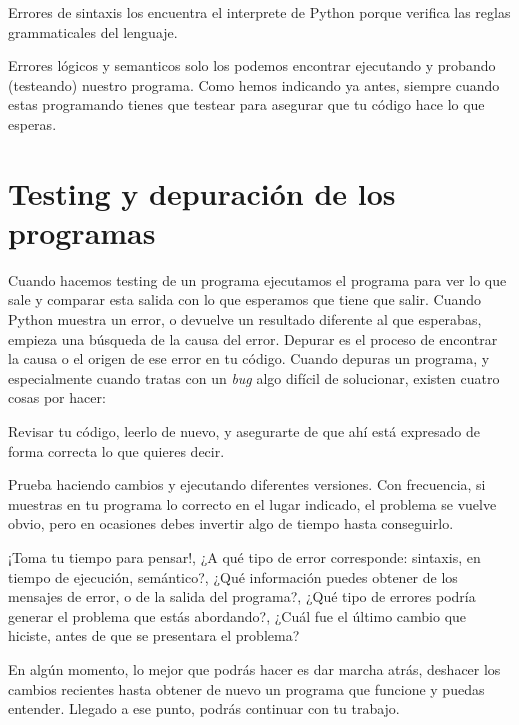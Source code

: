 Errores de sintaxis los encuentra el interprete de Python porque
verifica las reglas grammaticales del lenguaje.

Errores lógicos y semanticos solo los podemos encontrar ejecutando y
probando (testeando) nuestro programa. Como hemos indicando ya antes,
siempre cuando estas programando tienes que testear para asegurar que tu
código hace lo que esperas.

\hypertarget{depurando-los-programas}{%
\section{Testing y depuración de los programas}\label{depurando-los-programas}}

Cuando hacemos testing de un programa ejecutamos el programa para ver lo que sale y comparar esta salida con lo que esperamos que tiene que salir.
%
Cuando Python muestra un error, o devuelve un resultado
diferente al que esperabas, empieza una búsqueda de la causa del error. Depurar es el proceso de encontrar la causa o el origen de ese error en tu código. Cuando depuras un programa, y especialmente cuando tratas con un \emph{bug} algo difícil de solucionar, existen cuatro cosas por hacer:

\begin{description}
\tightlist
\item[leer]
Revisar tu código, leerlo de nuevo, y asegurarte de que ahí está
expresado de forma correcta lo que quieres decir.
\item[ejecutar]
Prueba haciendo cambios y ejecutando diferentes versiones. Con
frecuencia, si muestras en tu programa lo correcto en el lugar indicado,
el problema se vuelve obvio, pero en ocasiones debes invertir algo de
tiempo hasta conseguirlo.
\item[pensar detenidamente]
¡Toma tu tiempo para pensar!, ¿A qué tipo de error corresponde:
sintaxis, en tiempo de ejecución, semántico?, ¿Qué información puedes
obtener de los mensajes de error, o de la salida del programa?, ¿Qué
tipo de errores podría generar el problema que estás abordando?, ¿Cuál
fue el último cambio que hiciste, antes de que se presentara el
problema?
\item[retroceder]
En algún momento, lo mejor que podrás hacer es dar marcha atrás,
deshacer los cambios recientes hasta obtener de nuevo un programa que
funcione y puedas entender. Llegado a ese punto, podrás continuar con tu
trabajo.
\end{description}

